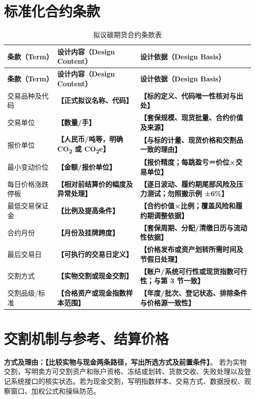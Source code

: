 \documentclass[UTF8,a4paper,11pt,oneside,fontset=fandol]{ctexart}
\newcommand{\fillin}[1]{\textcolor{promptgray}{\textbf{【#1】}}}
\begin{document}
\section{标准化合约条款}
\small
\begin{longtable}{@{}L{0.225\textwidth}L{0.265\textwidth}L{0.445\textwidth}@{}}
\caption{拟议碳期货合约条款表}\label{tab:contract}\\
\toprule
\textbf{条款（Term）} & \textbf{设计内容（Design Content）} & \textbf{设计依据（Design Basis）}\\
\midrule
\endfirsthead
\toprule
\textbf{条款（Term）} & \textbf{设计内容（Design Content）} & \textbf{设计依据（Design Basis）}\\
\midrule
\endhead
\bottomrule
\endfoot
交易品种及代码 & \fillin{正式拟议名称、代码} & \fillin{标的定义、代码唯一性核对与出处}\\
交易单位 & \fillin{数量/手} & \fillin{套保规模、现货批量、合约价值及来源}\\
报价单位 & \fillin{人民币/吨等，明确 CO\textsubscript{2} 或 CO\textsubscript{2}e} & \fillin{与标的计量、现货价格和交割品一致的理由}\\
最小变动价位 & \fillin{金额/报价单位} & \fillin{报价精度；每跳盈亏＝价位×交易单位}\\
每日价格涨跌停板 & \fillin{相对前结算价的幅度及异常处理} & \fillin{逐日波动、履约期尾部风险及压力测试；勿照搬示例 ±6\%}\\
最低交易保证金 & \fillin{比例及提高条件} & \fillin{合约价值×比例；覆盖风险和履约期调整依据}\\
合约月份 & \fillin{月份及挂牌跨度} & \fillin{套保周期、分配/清缴日历与流动性依据}\\
最后交易日 & \fillin{可执行的交易日定义} & \fillin{价格发布或资产划转所需时间及节假日处理}\\
交割方式 & \fillin{实物交割或现金交割} & \fillin{账户/系统可行性或现货指数可行性；与第 3 节一致}\\
交割品级/标准 & \fillin{合格资产或现金指数样本范围} & \fillin{年度/批次、登记状态、排除条件与价格源一致性}\\
\end{longtable}
\normalsize

\section{交割机制与参考、结算价格}
\noindent\textbf{方式及理由：}\fillin{比较实物与现金两条路径，写出所选方式及前置条件}。
若为实物交割，写明卖方可交割资产和账户资格、冻结或划转、货款交收、失败处理以及登记系统接口的核实状态。若为现金交割，写明指数样本、交易方式、数据授权、观察窗口、加权公式和操纵防范。
\end{document}
